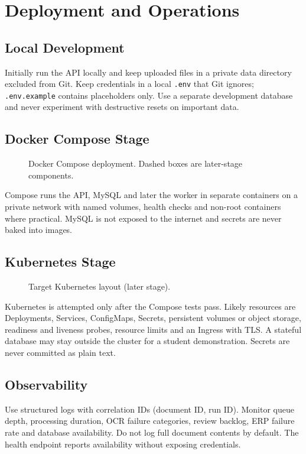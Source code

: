 \chapter{Deployment and Operations}\label{ch:deploy}
\section{Local Development}
Initially run the API locally and keep uploaded files in a private data directory excluded from Git. Keep credentials in a local \texttt{.env} that Git ignores; \texttt{.env.example} contains placeholders only. Use a separate development database and never experiment with destructive resets on important data.

\section{Docker Compose Stage}
\begin{figure}[H]\centering
\resizebox{\textwidth}{!}{}
\caption{Docker Compose deployment. Dashed boxes are later-stage components.}\label{fig:compose}
\end{figure}
Compose runs the API, MySQL and later the worker in separate containers on a private network with named volumes, health checks and non-root containers where practical. MySQL is not exposed to the internet and secrets are never baked into images.

\section{Kubernetes Stage}
\begin{figure}[H]\centering
\resizebox{\textwidth}{!}{}
\caption{Target Kubernetes layout (later stage).}\label{fig:k8s}
\end{figure}
Kubernetes is attempted only after the Compose tests pass. Likely resources are Deployments, Services, ConfigMaps, Secrets, persistent volumes or object storage, readiness and liveness probes, resource limits and an Ingress with TLS. A stateful database may stay outside the cluster for a student demonstration. Secrets are never committed as plain text.

\section{Observability}
Use structured logs with correlation IDs (document ID, run ID). Monitor queue depth, processing duration, OCR failure categories, review backlog, ERP failure rate and database availability. Do not log full document contents by default. The health endpoint reports availability without exposing credentials.

